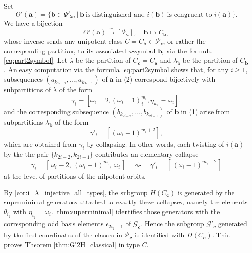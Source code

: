 \documentclass{amsart}
\theoremstyle{definition}
\newcommand{\cG}{\mathcal{G}}
\newcommand{\cP}{\mathcal{P}}
\newcommand{\ba}{\mathbf{a}}
\newcommand{\bb}{\mathbf{b}}
\newcommand{\bc}{{\mathbf{c}}}
\newcommand{\0}{\mathcal{O}}
\begin{document}

Set 
\[ \Theta'(\ba) = \{ \bb \in \Psi'_{2n} \,|\, \bb~  \text{is distinguished and } i(\bb)~\text{is congruent to } i(\ba) \}. \]
We have a bijection 
	\[ \Theta'(\ba)  \xrightarrow{\sim} [\cP_\bc], \quad \bb \mapsto C_\bb, \]
whose inverse sends any unipotent class $C=C_\bb \in \cP_\bc$, or rather the corresponding partition, to its associated $u$-symbol $\bb$, via the formula \eqref{eq:part2symbol}. Let $\lambda$ be the partition of $C_\bc = C_\ba$ and $\lambda_{\bb}$ be the partition of $C_\bb$. An easy computation via the formula \eqref{eq:part2symbol}shows that, for any $i \geq 1$, subsequences $(a_{k_{2i-2}},  \ldots, a_{k_{2i-1}})$ of $\ba$ in (2) correspond bijectively with subpartitions of $\lambda$ of the form    
	\[ \gamma_i = [\omega_{i}-2, (\omega_i-1)^{m_i}_i, \eta_{w_i} = \omega_{i}], \] 
and the corresponding subsequence $(b_{k_{2i-2}}, \ldots, b_{k_{2i-1}})$ of $\bb$ in (1) arise from subpartitions $\lambda_\bb$ of the form 
	\[\gamma'_i = [(\omega_i-1)^{m_i+2}], \] 
which are obtained from $\gamma_i$ by collapsing. 
In other words, each twisting of $i(\ba)$ by the the pair $\{k_{2i-2}, k_{2i-1}\}$ contributes an elementary collapse
\[
	\gamma_i=[\,\omega_i-2,\ (\omega_i-1)^{m_i},\ \omega_i\,]
	\quad\rightsquigarrow\quad
	\gamma'_i=[\,(\omega_i-1)^{m_i+2}\,]
\]
at the level of partitions of the nilpotent orbits.

By \cref{cor:i_A_injective_all_types}, the subgroup $H(C_\bc)$ is generated by the superminimal generators attached to exactly these collapses, namely the elements $\bar{\theta}_{i_j}$ with $\eta_{i_j} = \omega_i$. \cref{thm:superminimal} identifies those generators with the corresponding odd basis elements $e_{2i_j-1}$ of $\cG_\bc$. Hence the subgroup $\cG'_\bc$ generated by the first coordinates of the classes in $\cP_\bc$ is identified with $H(C_\bc)$. This proves Theorem \ref{thm:G'2H_classical} in type $C$. 




\end{document}
